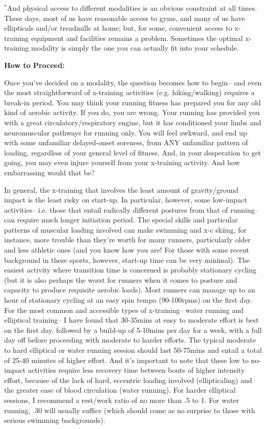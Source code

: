 $^*$And physical access to different modalities is an obvious constraint at all times. These days, most of us have reasonable access to gyms, and many of us have ellipticals and/or treadmills at home; but, for some, convenient access to x-training equipment and facilities remains a problem. Sometimes the optimal x-training modality is simply the one you can actually fit into your schedule.


\bigskip

\textbf{How to Proceed:}

\bigskip


Once you've decided on a modality, the question becomes how to begin-- and even the most straightforward of x-training activities (e.g. hiking/walking) requires a break-in period. You may think your running fitness has prepared you for any old kind of aerobic activity. If you do, you are wrong. Your running has provided you with a great circulatory/respiratory engine, but it has conditioned your limbs and neuromuscular pathways for running only. You will feel awkward, and end up with some unfamiliar delayed-onset soreness, from ANY unfamiliar pattern of loading, regardless of your general level of fitness. And, in your desperation to get going, you may even injure yourself from your x-training activity. And how embarrassing would that be?

In general, the x-training that involves the least amount of gravity/ground impact is the least risky on start-up. In particular, however, some low-impact activities-- i.e. those that entail radically different postures from that of running-- can require much longer initiation period. The special skills and particular patterns of muscular loading involved can make swimming and x-c skiing, for instance, more trouble than they're worth for many runners, particularly older and less athletic ones (and you know how you are! For those with some recent background in these sports, however, start-up time can be very minimal). The easiest activity where transition time is concerned is probably stationary cycling (but it is also perhaps the worst for runners when it comes to posture and capacity to produce requisite aerobic loads). Most runners can manage up to an hour of stationary cycling at an easy spin tempo (90-100rpms) on the first day. For the most common and accessible types of x-training-- water running and elliptical training-- I have found that 30-35mins at easy to moderate effort is best on the first day, followed by a build-up of 5-10mins per day for a week, with a full day off before proceeding with moderate to harder efforts. The typical moderate to hard elliptical or water running session should last 50-75mins and entail a total of 25-40 minutes of higher effort. And it's important to note that these low to no-impact activities require less recovery time between bouts of higher intensity effort, because of the lack of hard, eccentric loading involved (ellipticaling) and the greater ease of blood circulation (water running). For harder elliptical sessions, I recommend a rest/work ratio of no more than .5 to 1. For water running, .30 will usually suffice (which should come as no surprise to those with serious swimming backgrounds).

